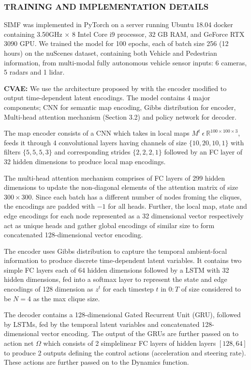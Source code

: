 \documentclass{article}
\begin{document}
\subsubsection{TRAINING AND IMPLEMENTATION DETAILS}
SIMF was implemented in PyTorch on a server running Ubuntu 18.04 docker containing 3.50GHz × 8 Intel Core i9 processor, 32 GB RAM, and GeForce RTX 3090 GPU. We trained the model for 100 epochs, each of batch size 256 (12 hours) on the nuScenes dataset, containing both Vehicle and Pedestrian information, from multi-modal fully autonomous vehicle sensor inputs: 6 cameras, 5 radars and 1 lidar.

\textbf{CVAE:} We use the architecture proposed by \cite{chen2022scept} with the encoder modified to output time-dependent latent encodings.  The model contains 4 major components; CNN for semantic map encoding, Gibbs distribution for encoder, Multi-head attention mechanism (Section 3.2) and policy network for decoder.

The map encoder consists of a CNN which takes in local maps $M^t \ \epsilon \ \mathbb{R}^{100 \times 100 \times 3} $, feeds it through 4 convolutional layers having channels of size $\{10,20,10,1\}$ with filters $\{5,5,5,3\}$ and corresponding strides $\{2,2,2,1\}$  followed by an FC layer of 32 hidden dimensions to produce local map encodings. %

The multi-head attention mechanism comprises of FC layers of 299 hidden dimensions to update the non-diagonal elements of the attention matrix of size $300 \times 300$. Since each batch has a different number of nodes froming the cliques, the encodings are padded with $-1$ for all heads.  Further, the local map, state and edge encodings for each node represented as a 32 dimensional vector respectively act as unique heads and gather global encodings of similar size to form concatenated 128-dimensional vector encoding.  

The encoder uses Gibbs distribution to capture the temporal ambient-focal information to produce discrete time-dependent latent variables. It contains two simple FC layers each of 64 hidden dimensions followed by a  LSTM with 32 hidden dimensions, fed into a softmax layer to represent the state and edge encodings of 128 dimension as $z^t$ for each timestep $t$ in $0:T$ of size considered to be $N=4$ as the max clique size. 

The decoder contains a 128-dimensional Gated Recurrent Unit (GRU), followed by LSTMs, fed by the temporal latent variables and concatenated 128-dimensional vector encoding. The output of the GRUs are further passed on to action net $\Omega$ which consists of 2 simplelinear FC layers of hidden layers $[128,64]$ to produce 2 outputs defining the control actions (acceleration and steering rate). These actions are further passed on to the Dynamics function.


% 
\end{document}
